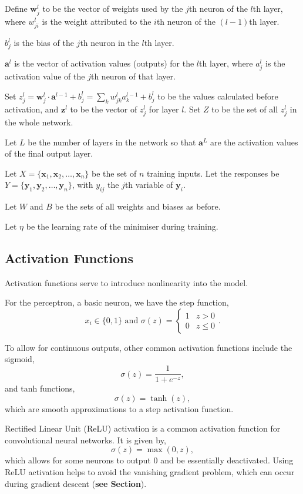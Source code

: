 Define $\mathbf{w}_j^l$ to be the vector of weights used by the $j$th neuron of the $l$th layer, where $w_{ji}^l$ is the weight attributed to the $i$th neuron of the $(l-1)$th layer.

$b_j^l$ is the bias of the $j$th neuron in the $l$th layer.

$\mathbf{a}^l$ is the vector of activation values (outputs) for the $l$th layer, where $a_j^l$ is the activation value of the $j$th neuron of that layer.

Set $z_j^l = \mathbf{w}_j^l\cdot \mathbf{a}^{l-1} + b_j^l= \sum_k w_{jk}^la_k^{l-1} + b_j^l$ to be the values calculated before activation, and $\mathbf{z}^l$ to be the vector of $z_j^l$ for layer $l$. Set $Z$ to be the set of all $z_j^l$ in the whole network.

Let $L$ be the number of layers in the network so that $\mathbf{a}^L$ are the activation values of the final output layer.

Let $X = \{\mathbf{x}_1, \mathbf{x}_2, \ldots, \mathbf{x}_n\}$ be the set of $n$ training inputs. Let the responses be $Y = \{\mathbf{y}_1, \mathbf{y}_2, \ldots, \mathbf{y}_n\}$, with $y_{ij}$ the $j$th variable of $\mathbf{y}_i$.

Let $W$ and $B$ be the sets of all weights and biases as before.

Let $\eta$ be the learning rate of the minimiser during training.

\subsection{Activation Functions}\label{nnets-act}

Activation functions serve to introduce nonlinearity into the model. 

For the perceptron, a basic neuron, we have the step function,
\[
	x_i \in \{0,1\} \text{ and } \sigma(z) = \begin{cases}
		1 & z > 0 \\
		0 & z \le 0
	\end{cases}.
\]

To allow for continuous outputs, other common activation functions include the sigmoid,
\[
	\sigma(z) = \dfrac{1}{1+e^{-z}},
\]
and tanh functions,
\[
	\sigma(z) = \tanh(z),
\]
which are smooth approximations to a step activation function.

Rectified Linear Unit (ReLU) activation is a common activation function for convolutional neural networks. It is given by,
\[
	\sigma(z) = \max(0, z),
\]
which allows for some neurons to output 0 and be essentially deactivated. Using ReLU activation helps to avoid the vanishing gradient problem, which can occur during gradient descent (\textbf{see Section}).

